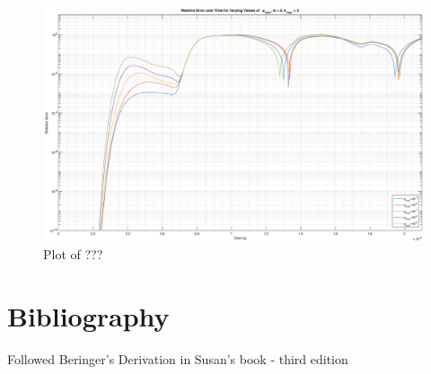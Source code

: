 \message{ !name(ECE742Project.tex)}\documentclass{article}
\begin{document}
\begin{figure}
  \centering
  \includegraphics[width=\textwidth]{Rel_Err_SigMax}
  \caption{Plot of ???}\label{fig:RelErrSigmax}
\end{figure}

\section{Bibliography}
Followed Beringer's Derivation in Susan's book - third edition
\end{document}
